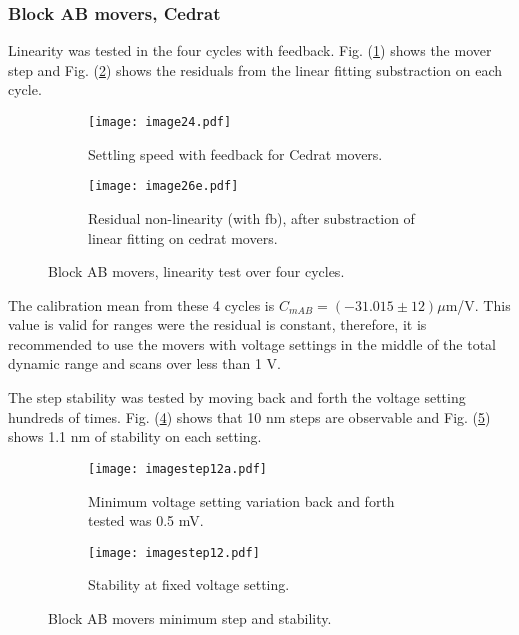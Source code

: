 \subsubsection{Block AB movers, Cedrat}
Linearity was tested in the four cycles with feedback. Fig. (\ref{f:Cedratmsteps}) shows the mover step and Fig. (\ref{f:Cedratlinres}) shows the residuals from the linear fitting substraction on each cycle.\par
\begin{figure}[!htb]
 \centering\hspace*{-0.6cm}
\begin{subfigure}{0.4\textwidth}
 \texttt{[image: image24.pdf]}\caption{Settling speed with feedback for Cedrat movers.}\label{f:Cedratmsteps}
\end{subfigure}\hspace*{1.5cm}
\begin{subfigure}{0.4\textwidth}
 \texttt{[image: image26e.pdf]}\caption{Residual non-linearity (with fb), after substraction of linear fitting on cedrat movers.}\label{f:Cedratlinres}
\end{subfigure}\caption{Block AB movers, linearity test over four cycles.}\label{f:Cedratfeedback}
\end{figure}
The calibration mean from these 4 cycles is $C_{mAB} = (-31.015\pm12)\mu$m/V. This value is valid for ranges were the residual is constant, therefore, it is recommended to use the movers with voltage settings in the middle of the total dynamic range and scans over less than 1 V.\par
The step stability was tested by moving back and forth the voltage setting hundreds of times. Fig. (\ref{f:Cedratstepstab}) shows that 10 nm steps are observable and Fig. (\ref{f:Cedratstab}) shows 1.1 nm of stability on each setting.\par
\begin{figure}[!htb]
 \centering\hspace*{-0.6cm}
\begin{subfigure}{0.4\textwidth}
\texttt{[image: imagestep12a.pdf]}\caption{Minimum voltage setting variation back and forth tested was 0.5 mV.}\label{f:Cedratstepstab}
\end{subfigure}\hspace*{1.5cm}
\begin{subfigure}{0.4\textwidth}
 \texttt{[image: imagestep12.pdf]}\caption{Stability at fixed voltage setting.}\label{f:Cedratstab}
\end{subfigure}\caption{Block AB movers minimum step and stability.}\label{f:Cedratstability}
\end{figure}
